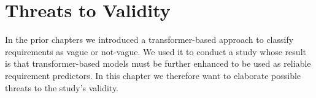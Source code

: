 \chapter{Threats to Validity}
\label{chp:threats_to_validity}
In the prior chapters we introduced a transformer-based approach to classify requirements as vague or not-vague.
We used it to conduct a study whose result is that transformer-based models must be further enhanced to be used as reliable requirement predictors.
In this chapter we therefore want to elaborate possible threats to the study's validity.






